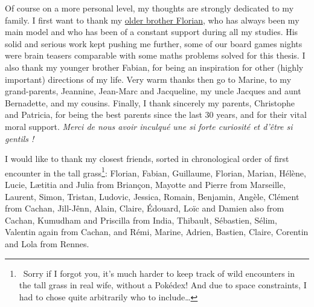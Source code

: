 \begin{acknowledgements}
Of course on a more personal level, my thoughts are strongly dedicated to my family.
%
I first want to thank my \href{https://paris-sorbonne.academia.edu/FBesson}{older brother Florian}, who has always been my main model and who has been of a constant support during all my studies. His solid and serious work kept pushing me further, some of our board games nights were brain teasers comparable with some maths problems solved for this thesis.
%
I also thank my younger brother Fabian, for being an inspiration for other (highly important) directions of my life.
Very warm thanks then go to Marine, to my grand-parents, Jeannine, Jean-Marc and Jacqueline, my uncle Jacques and aunt Bernadette, and my cousins.
Finally, I thank sincerely my parents, Christophe and Patricia, for being the best parents since the last 30 years, and for their vital moral support. \emph{Merci de nous avoir inculqué une si forte curiosité et d'être si gentils !}

I would like to thank my closest friends, sorted in chronological order of first encounter in the tall grass\footnote{~Sorry if I forgot you, it's much harder to keep track of wild encounters in the tall grass in real wife, without a Pokédex! And due to space constraints, I had to chose quite arbitrarily who to include\dots}: Florian, Fabian, Guillaume, Florian, Marian, Hélène, Lucie, Lætitia and Julia from Briançon, Mayotte and Pierre from Marseille, Laurent, Simon, Tristan, Ludovic, Jessica, Romain, Benjamin, Angèle, Clément from Cachan, Jill-Jênn, Alain, Claire, Édouard, Loïc and Damien also from Cachan, Kumudham and Priscilla from India, Thibault, Sébastien, Sélim, Valentin again from Cachan, and Rémi, Marine, Adrien, Bastien, Claire, Corentin and Lola from Rennes.


\end{acknowledgements}
